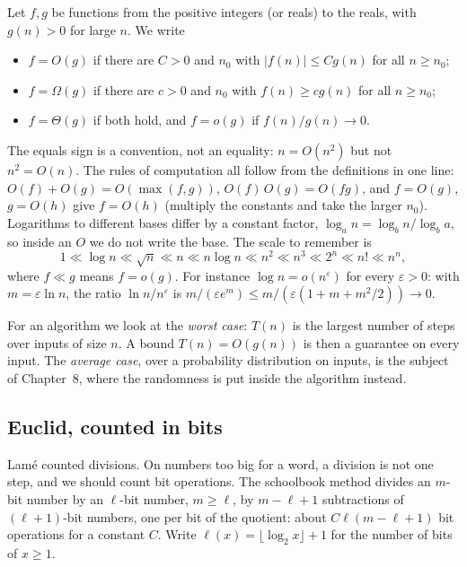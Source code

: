 \begin{definition}\label{def:bigo}
Let $f,g$ be functions from the positive integers (or reals) to the reals, with $g(n)>0$ for large $n$. We write
\begin{itemize}
\item $f=O(g)$ if there are $C>0$ and $n_0$ with $|f(n)|\le Cg(n)$ for all $n\ge n_0$;
\item $f=\Omega(g)$ if there are $c>0$ and $n_0$ with $f(n)\ge cg(n)$ for all $n\ge n_0$;
\item $f=\Theta(g)$ if both hold, and $f=o(g)$ if $f(n)/g(n)\to0$.
\end{itemize}
\end{definition}

The equals sign is a convention, not an equality: $n=O(n^2)$ but not $n^2=O(n)$. The rules of computation all follow from the
definitions in one line: $O(f)+O(g)=O(\max(f,g))$, $O(f)\,O(g)=O(fg)$, and $f=O(g)$, $g=O(h)$ give $f=O(h)$ (multiply the constants
and take the larger $n_0$). Logarithms to different bases differ by a constant factor, $\log_a n=\log_b n/\log_b a$, so inside an $O$ we
do not write the base. The scale to remember is
\[
1\ll\log n\ll\sqrt n\ll n\ll n\log n\ll n^2\ll n^3\ll 2^n\ll n!\ll n^n,
\]
where $f\ll g$ means $f=o(g)$. For instance $\log n=o(n^\varepsilon)$ for every $\varepsilon>0$: with $m=\varepsilon\ln n$, the ratio $\ln n/n^\varepsilon$
is $m/(\varepsilon e^m)\le m/(\varepsilon(1+m+m^2/2))\to0$.

For an algorithm we look at the \emph{worst case}: $T(n)$ is the largest number of steps over inputs of size $n$. A bound $T(n)=O(g(n))$
is then a guarantee on every input. The \emph{average case}, over a probability distribution on inputs, is the subject of Chapter~8,
where the randomness is put inside the algorithm instead.

\subsection*{Euclid, counted in bits}

Lam\'e counted divisions. On numbers too big for a word, a division is not one step, and we should count bit operations. The schoolbook
method divides an $m$-bit number by an $\ell$-bit number, $m\ge\ell$, by $m-\ell+1$ subtractions of $(\ell+1)$-bit numbers, one per bit of the
quotient: about $C\ell(m-\ell+1)$ bit operations for a constant $C$. Write $\ell(x)=\lfloor\log_2x\rfloor+1$ for the number of bits of $x\ge1$.

